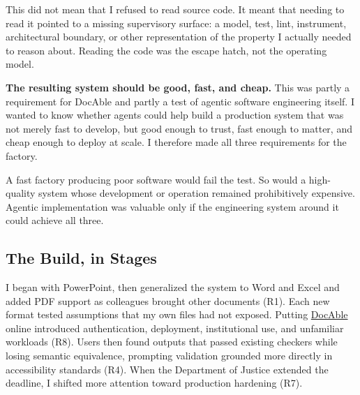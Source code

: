 This did not mean that I refused to read source code. It meant that needing to read it pointed to a missing supervisory surface: a model, test, lint, instrument, architectural boundary, or other representation of the property I actually needed to reason about. Reading the code was the escape hatch, not the operating model.


\textbf{The resulting system should be good, fast, and cheap.} This was partly a requirement for DocAble and partly a test of agentic software engineering itself. I wanted to know whether agents could help build a production system that was not merely fast to develop, but good enough to trust, fast enough to matter, and cheap enough to deploy at scale. I therefore made all three requirements for the factory.


A fast factory producing poor software would fail the test. So would a high-quality system whose development or operation remained prohibitively expensive. Agentic implementation was valuable only if the engineering system around it could achieve all three.

\subsection{The Build, in Stages}\label{heading:the-build-in-stages}


I began with PowerPoint, then generalized the system to Word and Excel and added PDF support as colleagues brought other documents (R1). Each new format tested assumptions that my own files had not exposed. Putting \href{\%7B\%7Bproduct_url\%7D\%7D}{DocAble} online introduced authentication, deployment, institutional use, and unfamiliar workloads (R8). Users then found outputs that passed existing checkers while losing semantic equivalence, prompting validation grounded more directly in accessibility standards (R4). When the Department of Justice extended the deadline, I shifted more attention toward production hardening (R7).


